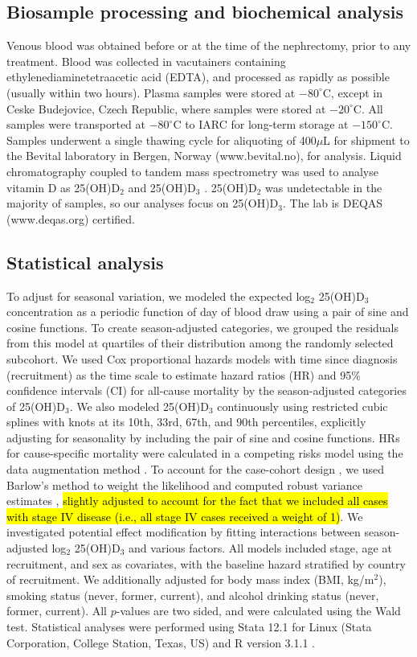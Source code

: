 \documentclass[a4paper,11pt]{article}
\begin{document}
\subsection*{Biosample processing and biochemical analysis}
Venous blood was obtained before or at the time of the nephrectomy, prior to 
any treatment. Blood was collected in vacutainers containing 
ethylenediaminetetraacetic acid (EDTA), and processed as rapidly as possible 
(usually within two hours). Plasma samples were stored at $-80^{\circ}$C, 
except in Ceske Budejovice, Czech Republic, where samples were stored at 
$-20^{\circ}$C. All samples were transported at $-80^{\circ}$C to IARC for 
long-term storage at $-150^{\circ}$C. Samples underwent a single thawing cycle 
for aliquoting of 400$\mu$L for shipment to the Bevital laboratory in Bergen, 
Norway (www.bevital.no), for analysis. Liquid chromatography coupled to tandem 
mass spectrometry was used to analyse vitamin D as 25(OH)D$_2$ and 
25(OH)D$_3$ \cite{midttun_determination_2011}. 25(OH)D$_2$ was undetectable in 
the majority of samples, so our analyses focus on 25(OH)D$_3$. The lab is DEQAS 
(www.deqas.org) certified.

\subsection*{Statistical analysis}
To adjust for seasonal variation, we modeled the expected log$_2$ 25(OH)D$_3$ 
concentration as a periodic function of day of blood draw using a pair of sine 
and cosine functions. To create season-adjusted categories, we grouped the 
residuals from this model at quartiles of their distribution among the randomly 
selected subcohort. We used Cox proportional hazards models with time since 
diagnosis (recruitment) as the time scale to estimate hazard ratios (HR) and 
95\% confidence intervals (CI) for all-cause mortality by the season-adjusted 
categories of 25(OH)D$_3$. We also modeled 25(OH)D$_3$ continuously using 
restricted cubic splines with knots at its 10th, 33rd, 67th, and 90th 
percentiles, explicitly adjusting for seasonality by including the pair of sine 
and cosine functions. HRs for cause-specific mortality were calculated in a 
competing risks model using the data augmentation method 
\cite{lunn_applying_1995}. To account for the case-cohort design 
\cite{prentice_case-cohort_1986}, we used Barlow's method to weight the 
likelihood and computed robust variance estimates \cite{barlow_robust_1994, 
barlow_analysis_1999}, \hl{slightly adjusted to account for the fact that we 
included all cases with stage IV disease (i.e., all stage IV cases received a weight 
of 1)}. We investigated potential effect modification by fitting 
interactions between season-adjusted log$_2$ 25(OH)D$_3$ and various factors. 
All models included stage, age at recruitment, and sex as covariates, with the 
baseline hazard stratified by country of recruitment. We additionally adjusted 
for body mass index (BMI, kg/m$^2$), smoking status (never, former, current), 
and alcohol drinking status (never, former, current).
All $p$-values are two sided, and were calculated using the Wald test. 
Statistical analyses were performed using Stata 12.1 for Linux (Stata 
Corporation, College Station, Texas, US) and R version 3.1.1 \cite{r_2014}.
\end{document}
